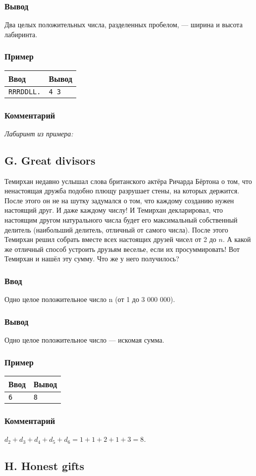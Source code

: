 \documentclass[10pt, a4paper]{article}
\newcommand{\informat}[1]
{
	\subsubsection*{Ввод} #1
}
\newcommand{\outformat}[1]
{
	\subsubsection*{Вывод} #1
}
\newcommand{\example}[2]
{
	\subsubsection*{Пример}
	\noindent
	\begin{center}
	\begin{tabularx}{\linewidth}{|X|X|}
	\hline
	Ввод & Вывод \\
	\hline
	{\tt #1} & {\tt #2}		\\
	\hline
	\end{tabularx}
	\end{center}
}
\newcommand{\excomm}[1]
{
	\subsubsection*{Комментарий}
	\textit{#1}
}
\begin{document}
\outformat{Два целых положительных числа, разделенных пробелом, --- ширина и высота лабиринта.}

\example{RRRDDLL.}{4 3}

\excomm{Лабиринт из примера:}
\begin{center}
\end{center}



\subsection*{G. Great divisors}

Темирхан недавно услышал слова британского актёра Ричарда Бёртона о том, что ненастоящая дружба подобно плющу разрушает стены, на которых держится. После этого он не на шутку задумался о том, что каждому созданию нужен настоящий друг. И даже каждому числу! И Темирхан декларировал, что настоящим другом натурального числа будет его максимальный собственный делитель (наибольший делитель, отличный от самого числа). После этого Темирхан решил собрать вместе всех настоящих друзей чисел от 2 до $n$. А какой же отличный способ устроить друзьям веселье, если их просуммировать! Вот Темирхан и нашёл эту сумму. Что же у него получилось?

\informat{Одно целое положительное число n (от 1 до 3 000 000).}

\outformat{Одно целое положительное число --- искомая сумма.}

\example{6}{8}

\excomm{$d_2 + d_3 + d_4 + d_5 + d_6 = 1 + 1 + 2 + 1 + 3 = 8$.}



\subsection*{H. Honest gifts}
\end{document}
